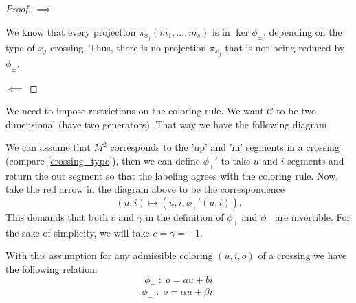 \begin{proof}\color{blue}
  $\implies$

  We know that every projection $\pi_{x_j}(m_1,...,m_s)$ is in $\ker\phi_\pm$, depending on the type of $x_j$ crossing. Thus, there is no projection $\pi_{x_j}$ that is not being reduced by $\phi_\pm$.

  $\impliedby$

\end{proof}

{\color{blue}We need to impose restrictions on the coloring rule.} We want $\mathcal{C}$ to be two dimensional (have two generators). That way we have the following diagram
\begin{center}
\end{center}
We can assume that $M^2$ corresponds to the 'up' and 'in' segments in a crossing (compare \cref{crossing_type}), then we can define $\phi_\pm'$ to take $u$ and $i$ segments and return the out segment so that the labeling agrees with the coloring rule. Now, take the red arrow in the diagram above to be the correspondence
$$(u, i)\mapsto (u, i, \phi_\pm'(u,i)).$$
This demands that both $c$ and $\gamma$ in the definition of $\phi_+$ and $\phi_-$ are invertible. For the sake of simplicity, we will take $c=\gamma=-1$. 

With this assumption for any admissible coloring $(u,i,o)$ of a crossing we have the following relation:
$$\phi_+\;:\;o=au+bi$$
$$\phi_-\;:\;o=\alpha u+\beta i.$$


